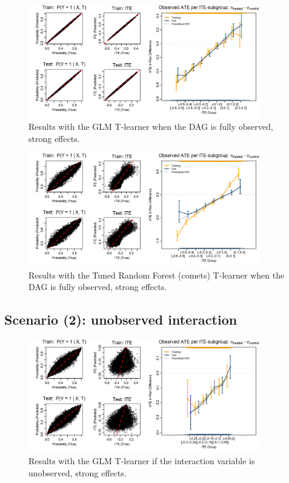 \begin{figure}[htbp]
\centering
\includegraphics[width=0.9\textwidth]{img/results_ITE_simulation/fully_observed_glm_tlearner.png}
\caption{Results with the GLM T-learner when the DAG is fully observed, strong effects.}
\label{fig:fully_observed_glm_tlearner}
\end{figure}


\begin{figure}[htbp]
\centering
\includegraphics[width=0.9\textwidth]{img/results_ITE_simulation/fully_observed_tuned_rf_tlearner.png}
\caption{Results with the Tuned Random Forest (comets) T-learner when the DAG is fully observed, strong effects.}
\label{fig:fully_observed_glm_tlearner}
\end{figure}




\subsection{Scenario (2): unobserved interaction}


\begin{figure}[htbp]
\centering
\includegraphics[width=0.9\textwidth]{img/results_ITE_simulation/unobserved_interaction_glm_tlearner.png}
\caption{Results with the GLM T-learner if the interaction variable is unobserved, strong effects.}
\label{fig:unobserved_interaction_glm_tlearner}
\end{figure}


